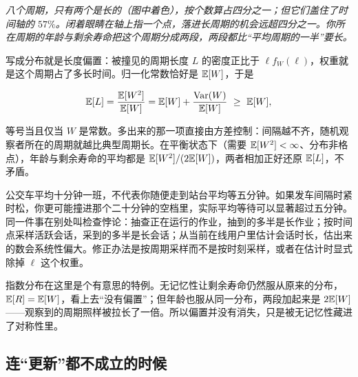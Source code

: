 \begin{center}

\emph{八个周期，只有两个是长的（图中着色），按个数算占四分之一；但它们盖住了时间轴的 \(57\%\)。闭着眼睛在轴上指一个点，落进长周期的机会远超四分之一。你所在周期的年龄与剩余寿命把这个周期分成两段，两段都比``平均周期的一半''要长。}
\end{center}

写成分布就是长度偏置：被撞见的周期长度 \(L\) 的密度正比于 \(\ell f_W(\ell)\)，权重就是这个周期占了多长时间。归一化常数恰好是 \(\mathbb{E}[W]\)，于是

\[
\E[L]=\frac{\E[W^2]}{\E[W]}=\E[W]+\frac{\Var(W)}{\E[W]}\ \ge\ \E[W],
\]

等号当且仅当 \(W\) 是常数。多出来的那一项直接由方差控制：间隔越不齐，随机观察者所在的周期就越比典型周期长。在平衡状态下（需要 \(\mathbb{E}[W^2]<\infty\)、分布非格点），年龄与剩余寿命的平均都是 \(\mathbb{E}[W^2]/(2\mathbb{E}[W])\)，两者相加正好还原 \(\mathbb{E}[L]\)，不矛盾。

公交车平均十分钟一班，不代表你随便走到站台平均等五分钟。如果发车间隔时紧时松，你更可能撞进那个二十分钟的空档里，实际平均等待可以显著超过五分钟。同一件事在别处叫检查悖论：抽查正在运行的作业，抽到的多半是长作业；按时间点采样活跃会话，采到的多半是长会话；从当前在线用户里估计会话时长，估出来的数会系统性偏大。修正办法是按周期采样而不是按时刻采样，或者在估计时显式除掉 \(\ell\) 这个权重。

指数分布在这里是个有意思的特例。无记忆性让剩余寿命仍然服从原来的分布，\(\mathbb{E}[R]=\mathbb{E}[W]\)，看上去``没有偏置''；但年龄也服从同一分布，两段加起来是 \(2\mathbb{E}[W]\)——观察到的周期照样被拉长了一倍。所以偏置并没有消失，只是被无记忆性藏进了对称性里。

\subsection{连``更新''都不成立的时候}

